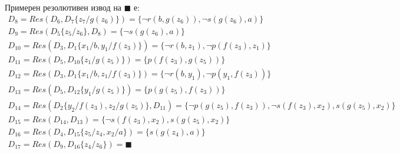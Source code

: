 \documentclass[12pt]{article}
\begin{document}
\begin{addmargin}[1em]{2em}
Примерен резолютивен извод на $ \blacksquare $ е: \\
\begin{gather*}
    D_8 = Res(D_6, D_7\{z_7/g(z_6)\}) = \{\neg r(b, g(z_6)), \neg s(g(z_6),a)\}\\
    D_9 = Res(D_5\{z_5/z_6\},D_8)= \{\neg s(g(z_6),a)\}\\
    D_{10} = Res(D_3, D_1\{x_1/b, y_1/f(z_3)\})= \{\neg r(b,z_1), \neg p(f(z_3),z_1)\}\\
    D_{11} = Res(D_5, D_{10}\{z_1/g(z_5)\})= \{p(f(z_3),g(z_5))\}\\
    D_{12} = Res(D_3, D_1\{x_1/b, z_1/f(z_3)\})= \{\neg r(b,y_1), \neg p(y_1, f(z_3))\}\\
    D_{13} = Res(D_5, D_{12}\{y_1/g(z_5)\})= \{p(g(z_5),f(z_3))\}\\
    D_{14} = Res(D_2\{y_2/f(z_3), z_2/g(z_5)\}, D_{11})= \{\neg p(g(z_5),f(z_3)), \neg s(f(z_3),x_2), s(g(z_5),x_2)\}\\
    D_{15} = Res(D_{14}, D_{13}) = \{\neg s(f(z_3),x_2), s(g(z_5),x_2)\}\\
    D_{16} = Res(D_4, D_{15}\{z_5/z_4, x_2/a\}) = \{s(g(z_4), a)\}\\
    D_{17} = Res(D_9, D_{16}\{z_4/z_6\}) = \blacksquare
\end{gather*}
\end{addmargin}
\end{document}
